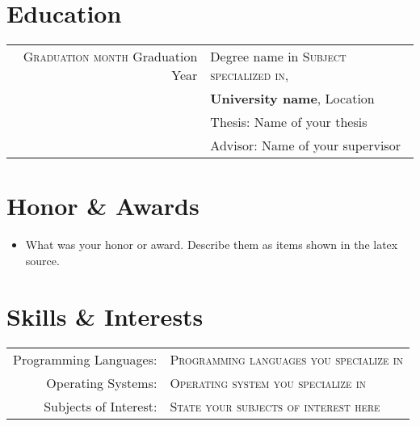 \section{Education}
\begin{tabular}{rl}	
 \textsc{Graduation month} Graduation Year & Degree name in \textsc{Subject specialized in},\\& \textbf{University name}, Location\\
& Thesis: Name of your thesis \\& Advisor: {Name of your supervisor}
\end{tabular}


%

\section{Honor \& Awards}

\begin{itemize}

\item What was your honor or award. Describe them as items shown in the latex source.
\end{itemize}

\section{Skills \& Interests}
\begin{tabular}{rl}
 Programming Languages:& \textsc{Programming languages you specialize in}
\setmainfont[SmallCapsFont=Fontin-SmallCaps.otf]{Fontin.otf}\\
Operating Systems:& \textsc{Operating system you specialize in}\\
Subjects of Interest:& \textsc{State your subjects of interest here}
\end{tabular}


